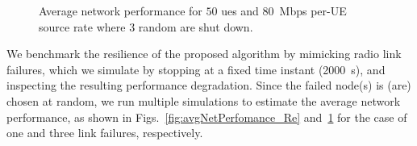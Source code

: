 \begin{figure}[t!]
\centering
{}
\hfill
{}
  
\caption{Average network performance for $50$ \glspl{ue} and $80$~Mbps per-UE source rate where 3 random \nodes{} are shut down.}
  \label{fig:avgNetPerfomance_Re2}
\end{figure}

We benchmark the resilience of the proposed algorithm by mimicking radio link failures, which we simulate by stopping \nodes{} at a fixed time instant (2000~s), and inspecting the resulting performance degradation.
Since the failed node(s) is (are) chosen at random, we run multiple simulations to estimate the average network performance, as shown in Figs.~\ref{fig:avgNetPerfomance_Re} and~\ref{fig:avgNetPerfomance_Re2} for the case of one and three link failures, respectively.

